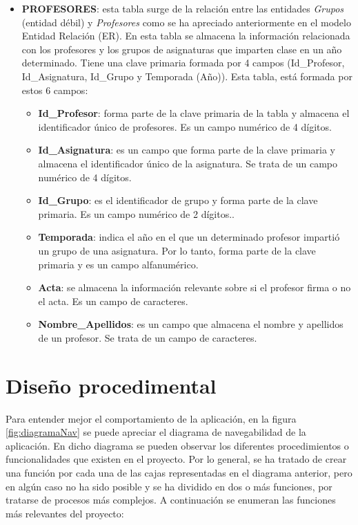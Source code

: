 \begin{itemize}
\item
\textbf{PROFESORES}: esta tabla surge de la relación entre las entidades \emph{Grupos} (entidad débil) y \emph{Profesores} como se ha apreciado anteriormente en el modelo Entidad Relación (ER). En esta tabla se almacena la información relacionada con los profesores y los grupos de asignaturas que imparten clase en un año determinado. Tiene una clave primaria formada por 4 campos (Id\_Profesor, Id\_Asignatura, Id\_Grupo y Temporada (Año)). Esta tabla, está formada por estos 6 campos:
\begin{itemize}
\item
\textbf{Id\_Profesor}: forma parte de la clave primaria de la tabla y almacena el identificador único de profesores. Es un campo numérico de 4 dígitos.
\item
\textbf{Id\_Asignatura}: es un campo que forma parte de la clave primaria y almacena el identificador único de la asignatura. Se trata de un campo numérico de 4 dígitos.
\item
\textbf{Id\_Grupo}: es el identificador de grupo y forma parte de la clave primaria. Es un campo numérico de 2 dígitos..
\item
\textbf{Temporada}: indica el año en el que un determinado profesor impartió un grupo de una asignatura. Por lo tanto, forma parte de la clave primaria y es un campo alfanumérico.
\item
\textbf{Acta}: se almacena la información relevante sobre si el profesor firma o no el acta. Es un campo de caracteres.
\item
\textbf{Nombre\_Apellidos}: es un campo que almacena el nombre y apellidos de un profesor. Se trata de un campo de caracteres.
\end{itemize}

\end{itemize}




\section{Diseño procedimental}

Para entender mejor el comportamiento de la aplicación, en la figura \ref{fig:diagramaNav} se puede apreciar el diagrama de navegabilidad de la aplicación.
En dicho diagrama se pueden observar los diferentes procedimientos o funcionalidades que existen en el proyecto. Por lo general, se ha tratado de crear una función por cada una de las cajas representadas en el diagrama anterior, pero en algún caso no ha sido posible y se ha dividido en dos o más funciones, por tratarse de procesos más complejos. A continuación se enumeran las funciones más relevantes del proyecto:

